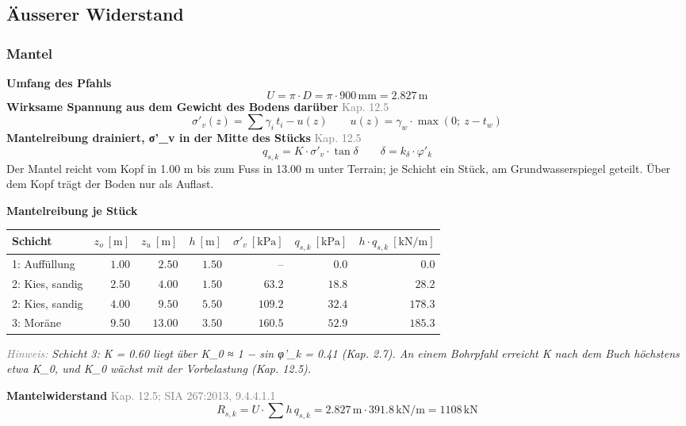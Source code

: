 \documentclass[11pt,a4paper]{article}
\newcommand{\normref}[1]{{\small\textcolor{gray}{#1}}}
\newcommand{\hinweis}[2]{\par\noindent\textcolor{gray}{\textit{#1:}} \textit{#2}\par}
\begin{document}
\subsection{Äusserer Widerstand}
\subsubsection{Mantel}
\noindent\textbf{Umfang des Pfahls}
\begin{equation*}
U = \pi \cdot D = \pi \cdot 900\,\mathrm{mm} = 2.827\,\mathrm{m}
\end{equation*}
\noindent\textbf{Wirksame Spannung aus dem Gewicht des Bodens darüber} \hfill \normref{Kap. 12.5}
\begin{equation*}
\sigma'_v(z) = \sum \gamma_i \, t_i - u(z) \qquad u(z) = \gamma_w \cdot \max\left(0;\ z - t_w\right)
\end{equation*}
\noindent\textbf{Mantelreibung drainiert, σ'\_v in der Mitte des Stücks} \hfill \normref{Kap. 12.5}
\begin{equation*}
q_{s,k} = K \cdot \sigma'_v \cdot \tan\delta \qquad \delta = k_{\delta} \cdot \varphi'_k
\end{equation*}
Der Mantel reicht vom Kopf in 1.00 m bis zum Fuss in 13.00 m unter Terrain; je Schicht ein Stück, am Grundwasserspiegel geteilt. Über dem Kopf trägt der Boden nur als Auflast.

\noindent\textbf{Mantelreibung je Stück}
\begin{longtable}{lrrrrrr}
\hline
Schicht & $z_o\ [\mathrm{m}]$ & $z_u\ [\mathrm{m}]$ & $h\ [\mathrm{m}]$ & $\sigma'_v\ [\mathrm{kPa}]$ & $q_{s,k}\ [\mathrm{kPa}]$ & $h \cdot q_{s,k}\ [\mathrm{kN/m}]$ \\
\hline
\endhead
1: Auffüllung & $1.00$ & $2.50$ & $1.50$ & – & $0.0$ & $0.0$ \\
2: Kies, sandig & $2.50$ & $4.00$ & $1.50$ & $63.2$ & $18.8$ & $28.2$ \\
2: Kies, sandig & $4.00$ & $9.50$ & $5.50$ & $109.2$ & $32.4$ & $178.3$ \\
3: Moräne & $9.50$ & $13.00$ & $3.50$ & $160.5$ & $52.9$ & $185.3$ \\
\hline
\end{longtable}
\hinweis{Hinweis}{Schicht 3: K = 0.60 liegt über K\_0 ≈ 1 − sin φ'\_k = 0.41 (Kap. 2.7). An einem Bohrpfahl erreicht K nach dem Buch höchstens etwa K\_0, und K\_0 wächst mit der Vorbelastung (Kap. 12.5).}
\noindent\textbf{Mantelwiderstand} \hfill \normref{Kap. 12.5; SIA 267:2013, 9.4.4.1.1}
\begin{equation*}
R_{s,k} = U \cdot \sum h \, q_{s,k} = 2.827\,\mathrm{m} \cdot 391.8\,\mathrm{kN}/\mathrm{m} = 1108\,\mathrm{kN}
\end{equation*}
\end{document}
